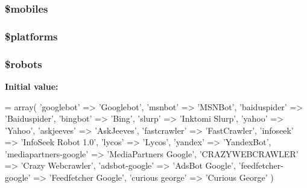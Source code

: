 \subsubsection[{\$mobiles}]{\setlength{\rightskip}{0pt plus 5cm}\$mobiles}\label{application_2config_2user__agents_8php_a6928dde5aa0be443766d5b2376de908a}
\hypertarget{application_2config_2user__agents_8php_a1c1a0a860242698ee6b3f4ef7d6eb343}{}
\subsubsection[{\$platforms}]{\setlength{\rightskip}{0pt plus 5cm}\$platforms}\label{application_2config_2user__agents_8php_a1c1a0a860242698ee6b3f4ef7d6eb343}
\hypertarget{application_2config_2user__agents_8php_a5752e2a66d1c03bc34666492746037ab}{}
\subsubsection[{\$robots}]{\setlength{\rightskip}{0pt plus 5cm}\$robots}\label{application_2config_2user__agents_8php_a5752e2a66d1c03bc34666492746037ab}
{\bfseries Initial value\+:}
\begin{DoxyCode}
= array(
    \textcolor{stringliteral}{'googlebot'}     => \textcolor{stringliteral}{'Googlebot'},
    \textcolor{stringliteral}{'msnbot'}        => \textcolor{stringliteral}{'MSNBot'},
    \textcolor{stringliteral}{'baiduspider'}       => \textcolor{stringliteral}{'Baiduspider'},
    \textcolor{stringliteral}{'bingbot'}       => \textcolor{stringliteral}{'Bing'},
    \textcolor{stringliteral}{'slurp'}         => \textcolor{stringliteral}{'Inktomi Slurp'},
    \textcolor{stringliteral}{'yahoo'}         => \textcolor{stringliteral}{'Yahoo'},
    \textcolor{stringliteral}{'askjeeves'}     => \textcolor{stringliteral}{'AskJeeves'},
    \textcolor{stringliteral}{'fastcrawler'}       => \textcolor{stringliteral}{'FastCrawler'},
    \textcolor{stringliteral}{'infoseek'}      => \textcolor{stringliteral}{'InfoSeek Robot 1.0'},
    \textcolor{stringliteral}{'lycos'}         => \textcolor{stringliteral}{'Lycos'},
    \textcolor{stringliteral}{'yandex'}        => \textcolor{stringliteral}{'YandexBot'},
    \textcolor{stringliteral}{'mediapartners-google'}  => \textcolor{stringliteral}{'MediaPartners Google'},
    \textcolor{stringliteral}{'CRAZYWEBCRAWLER'}   => \textcolor{stringliteral}{'Crazy Webcrawler'},
    \textcolor{stringliteral}{'adsbot-google'}     => \textcolor{stringliteral}{'AdsBot Google'},
    \textcolor{stringliteral}{'feedfetcher-google'}    => \textcolor{stringliteral}{'Feedfetcher Google'},
    \textcolor{stringliteral}{'curious george'}    => \textcolor{stringliteral}{'Curious George'}
)
\end{DoxyCode}
